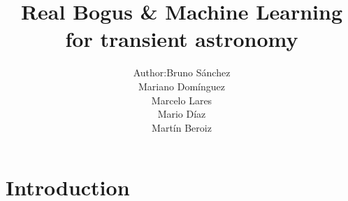 \documentclass[10pt]{beamer}
\begin{document}
\title[RB \& ML for transient astronomy]
{Real Bogus \& Machine Learning for transient astronomy}
\author{\begin{tabular}{r@{}l} 
Author:      & Bruno S\'anchez \\[1ex]   & Mariano Dom\'{i}nguez\\ & Marcelo Lares\\ & Mario D\'{i}az \\ & Mart\'{i}n Beroiz%
\end{tabular}}

\frame{\titlepage}
\section{Introduction}
\frame{\tableofcontents[ 
    currentsection, 
    sectionstyle=show/hide, 
    sectionstyle=show/shaded, 
    ]}
\end{document}
